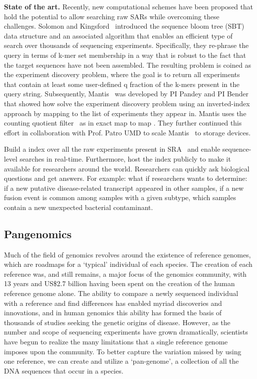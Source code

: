 \noindent
{\bf State of the art.}
Recently, new computational schemes have been proposed
that hold the potential to allow searching raw SARs while overcoming these challenges. Solomon and Kingsford~\cite{solomon2016fast} introduced the sequence bloom tree (SBT) data structure and an associated algorithm that enables an efficient type of search over thousands of sequencing experiments. Specifically, they re-phrase the query in terms of k-mer set membership in a way that is robust to the fact that the target sequences have not been assembled. The resulting problem is coined as the experiment discovery problem, where the goal is to return all experiments that contain at least some user-defined q fraction of the k-mers present in the query string.
%
Subsequently, Mantis~\cite{PandeyABFJP18Cell} was developed by PI Pandey and PI Bender that showed how solve the experiment discovery problem using an inverted-index approach by mapping \kmers to the list of experiments they appear in. Mantis uses the counting quotient filter~\cite{PandeyBJP17} as in exact map to map \kmers. They further continued this effort in collaboration with Prof. Patro UMD to scale Mantis~\cite{AlmodaresiPFJP19,AlmodaresiPFJP20} to storage devices.


\begin{rproblem}
Build a \kmer index over all the raw experiments present in SRA~\cite{kodama2012sequence} and enable sequence-level searches in real-time. Furthermore, host the index publicly to make it available for researchers around the world. Researchers can quickly ask biological questions and get answers. For example: what if researchers wants to determine: if a new putative disease-related transcript appeared in other samples, if a new fusion event is
common among samples with a given subtype, which samples contain a new unexpected bacterial contaminant. 
\label{rprob:peppermint2}
\end{rproblem}

\subsection{Pangenomics}

Much of the field of genomics revolves around the existence of reference genomes, which are roadmaps for a ‘typical’ individual of each species. The creation of each reference was, and still remains, a major focus of the genomics community, with 13 years and US\$2.7 billion having been spent on the creation of the human reference genome alone. The ability to compare a newly sequenced individual with a reference and find differences has enabled myriad discoveries and innovations, and in human genomics this ability has formed the basis of thousands of studies seeking the genetic origins of disease. However, as the number and scope of sequencing experiments have grown dramatically, scientists have begun to realize the many limitations that a single reference genome imposes upon the community. To better capture the variation missed by using one reference, we can create and utilize a ‘pan-genome’, a collection of all the DNA sequences that occur in a species.

